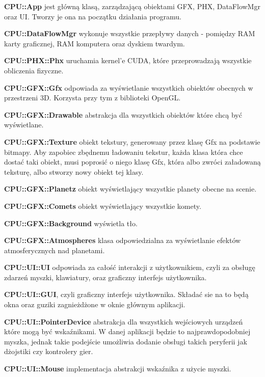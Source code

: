 \begin{description}
\item{\bf CPU::App} jest główną klasą, zarządzającą obiektami GFX, PHX, DataFlowMgr oraz UI. Tworzy je ona na początku działania programu.
\item{\bf CPU::DataFlowMgr} wykonuje wszystkie przepływy danych - pomiędzy RAM karty graficznej, RAM komputera oraz dyskiem twardym.
\item{}
\item{\bf CPU::PHX::Phx} uruchamia kernel'e CUDA, które przeprowadzają wszystkie obliczenia fizyczne.
\item{}
\item{\bf CPU::GFX::Gfx} odpowiada za wyświetlanie wszystkich obiektów obecnych w przestrzeni 3D. Korzysta przy tym z biblioteki OpenGL.
\item{\bf CPU::GFX::Drawable} abstrakcja dla wszystkich obiektów które chcą być wyświetlane.
\item{\bf CPU::GFX::Texture} obiekt tekstury, generowany przez klasę Gfx na podstawie bitmapy. Aby zapobiec zbędnemu ładowaniu tekstur, każda klasa która chce dostać taki obiekt, musi poprosić o niego klasę Gfx, która albo zwróci załadowaną teksturę, albo stworzy nowy obiekt tej klasy.
\item{\bf CPU::GFX::Planetz} obiekt wyświetlający wszystkie planety obecne na scenie.
\item{\bf CPU::GFX::Comets} obiekt wyświetlający wszystkie komety.
\item{\bf CPU::GFX::Background} wyświetla tło.
\item{\bf CPU::GFX::Atmospheres} klasa odpowiedzialna za wyświetlanie efektów atmosferycznych nad planetami.
\item{}
\item{\bf CPU::UI::UI} odpowiada za całość interakcji z użytkownikiem, czyli za obsługę zdarzeń myszki, klawiatury, oraz graficzny interfejs użytkownika.
\item{\bf CPU::UI::GUI}, czyli graficzny interfejs użytkownika. Składać sie na to będą okna oraz guziki zagnieżdżone w oknie głównym aplikacji.
\item{\bf CPU::UI::PointerDevice} abstrakcja dla wszystkich wejściowych urządzeń które mogą być wskaźnikami. W danej aplikacji będzie to najprawdopodobniej myszka, jednak takie podejście umożliwia dodanie obsługi takich peryferii jak dżojstiki czy kontrolery gier.
\item{\bf CPU::UI::Mouse} implementacja abstrakcji wskaźnika z użycie myszki.

\end{description}
